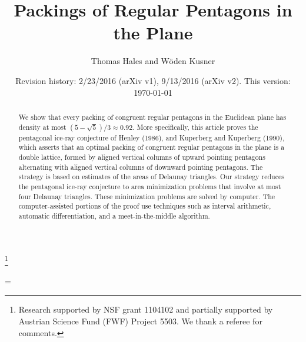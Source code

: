 \documentclass{amsart}
\theoremstyle{plain}
\theoremstyle{definition}
\theoremstyle{remark}
\begin{document}
\title
    {Packings of Regular Pentagons in the Plane}
\author{Thomas Hales and W\"oden Kusner}
\date{Revision history: 2/23/2016 (arXiv v1), 9/13/2016 (arXiv v2). This version: \today}
\thanks{Research supported by NSF grant 1104102 and partially supported by Austrian Science Fund (FWF) Project 5503. We thank a referee for comments.}

\begin{abstract}  
We show that every packing of congruent regular pentagons in the Euclidean plane has
density at most $(5-\sqrt5)/3\approx 0.92$.     More specifically,
this article proves the pentagonal ice-ray
conjecture of Henley (1986), and Kuperberg and Kuperberg (1990), 
which asserts that an optimal packing of congruent regular pentagons in the plane is a double lattice,
formed by aligned vertical columns of upward pointing pentagons alternating
with aligned vertical columns of downward pointing pentagons.  The strategy is based on estimates
of the areas of Delaunay triangles.  Our strategy reduces the pentagonal ice-ray conjecture to
area minimization problems that involve at most four Delaunay triangles.  These minimization problems
are solved by computer.  The computer-assisted portions of the proof use techniques such as
interval arithmetic, automatic differentiation, and a meet-in-the-middle algorithm.
\end{abstract}


\parskip=\baselineskip

 \maketitle



    


      
%
      
       
%
      
      
%





%
\end{document}
